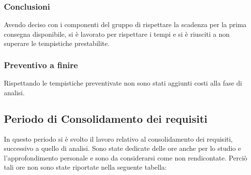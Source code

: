         \subsubsection{Conclusioni}
        Avendo deciso con i componenti del gruppo di rispettare la scadenza per la prima consegna disponibile, si è lavorato per rispettare i tempi e si è riusciti a non superare le tempistiche prestabilite.

        \subsubsection{Preventivo a finire}
        Rispettando le tempistiche preventivate non sono stati aggiunti costi alla fase di analisi.

    \newpage
    \subsection{Periodo di Consolidamento dei requisiti}
        In questo periodo si è svolto il lavoro relativo al consolidamento dei requisiti, successivo a quello di analisi. Sono state dedicate delle ore anche per lo studio e l'approfondimento personale e sono da considerarsi come non rendicontate. Perciò tali ore non sono state riportate nella seguente tabella:


